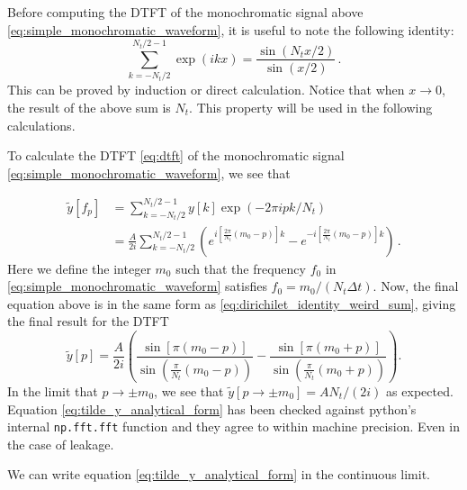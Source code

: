 \documentclass{article}
\begin{document}
Before computing the DTFT of the monochromatic signal above \eqref{eq:simple_monochromatic_waveform}, it is useful to note the following identity: 
\begin{equation}\label{eq:dirichilet_identity_weird_sum}
\sum_{k = -N_{t}/2}^{N_{t}/2 - 1} \exp(i k x) = \frac{\sin(N_{t}x/2)}{\sin(x/2)}\,.
\end{equation}
This can be proved by induction or direct calculation. Notice that when $x \rightarrow 0$, the result of the above sum is $N_{t}$. This property will be used in the following calculations. 

To calculate the DTFT \eqref{eq:dtft} of the monochromatic signal \eqref{eq:simple_monochromatic_waveform}, we see that

\begin{align}
\tilde{y}[f_{p}] & =\sum_{k = -N_{t}/2}^{N_{t}/2 - 1} y[k]\exp(-2\pi i p k / N_{t}) \\
&= \frac{A}{2i}\sum_{k = -N_{t}/2}^{N_{t}/2 - 1} \left( e^{i\left[\frac{2\pi}{N_{t}}(m_{0} - p)\right]k} - e^{-i\left[\frac{2\pi}{N_{t}}(m_{0} - p)\right]k}\right)\,.
\end{align}
Here we define the integer $m_{0}$ such that the frequency $f_{0}$ in \eqref{eq:simple_monochromatic_waveform} satisfies $f_{0} = m_{0}/(N_{t}\Delta t)$. Now, the final equation above is in the same form as \eqref{eq:dirichilet_identity_weird_sum}, giving the final result for the DTFT
\begin{equation}\label{eq:tilde_y_analytical_form}
\tilde{y}[p] = \frac{A}{2i}\left(\frac{\sin[\pi(m_{0} - p)]}{\sin\left(\frac{\pi}{N_{t}}(m_{0} - p)\right)} - \frac{\sin[\pi(m_{0} + p)]}{\sin\left(\frac{\pi}{N_{t}}(m_{0} + p)\right)}\right).
\end{equation}
In the limit that $p \rightarrow \pm m_{0}$, we see that $\tilde{y}[p \rightarrow \pm m_{0}] = AN_{t}/(2i)$ as expected. Equation \eqref{eq:tilde_y_analytical_form} has been checked against python's internal \texttt{np.fft.fft} function and they agree to within machine precision. Even in the case of leakage.

We can write equation \eqref{eq:tilde_y_analytical_form} in the continuous limit. 
\end{document}
